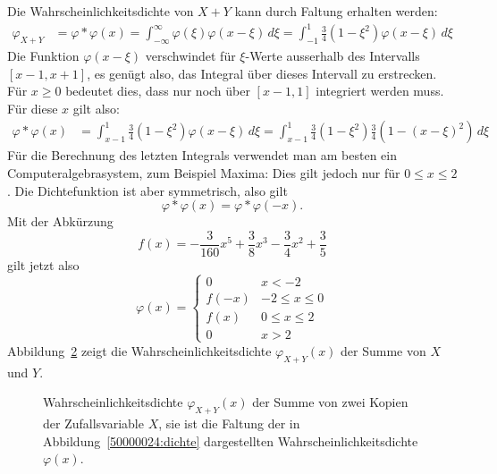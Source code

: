 \begin{loesung}
\begin{teilaufgaben}
\begin{figure}
{\label{50000024:exvarx}}
\end{figure}
\item
Die Wahrscheinlichkeitsdichte von $X+Y$ kann durch Faltung erhalten werden:
\begin{align*}
\varphi_{X+Y}&=\varphi*\varphi(x)
=\int_{-\infty}^{\infty}\varphi(\xi)\varphi(x-\xi)\,d\xi
=\int_{-1}^1\frac34(1-\xi^2)\varphi(x-\xi)\,d\xi
\end{align*}
Die Funktion $\varphi(x-\xi)$ verschwindet für $\xi$-Werte ausserhalb
des Intervalls $[x-1,x+1]$, es genügt also, das Integral über dieses
Intervall zu erstrecken. Für $x\ge 0$ bedeutet dies, dass nur noch
über $[x-1,1]$ integriert werden muss. Für diese $x$ gilt also:
\begin{align*}
\varphi*\varphi(x)
&=
\int_{x-1}^1 \frac34(1-\xi^2)\varphi(x-\xi)\,d\xi
=
\int_{x-1}^1 \frac34(1-\xi^2)\frac34(1-(x-\xi)^2)\,d\xi
\end{align*}
Für die Berechnung des letzten Integrals verwendet man am besten
ein Computeralgebrasystem, zum Beispiel Maxima:
Dies gilt jedoch nur für $0\le x \le 2$. Die Dichtefunktion ist
aber symmetrisch, also gilt
\[
\varphi*\varphi(x)=\varphi*\varphi(-x).
\]
Mit der Abkürzung
\[
f(x)=-\frac3{160}x^5+\frac38x^3-\frac34x^2+\frac35
\]
gilt jetzt also
\[
\varphi(x)=\begin{cases}
0&x<-2\\
f(-x)&-2\le x\le 0\\
f(x)&0\le x \le 2\\
0&x>2
\end{cases}
\]
Abbildung~\ref{50000024:summe} zeigt die Wahrscheinlichkeitsdichte $\varphi_{X+Y}(x)$
der Summe von $X$ und $Y$.
\qedhere
\begin{figure}
\centering
\def\h{2.5}
\caption{Wahrscheinlichkeitsdichte $\varphi_{X+Y}(x)$ der Summe von zwei Kopien
der Zufallsvariable $X$, sie ist die Faltung der in Abbildung~\ref{50000024:dichte}
dargestellten Wahrscheinlichkeitsdichte $\varphi(x)$.
\label{50000024:summe}}
\end{figure}
\end{teilaufgaben}
\end{loesung}

